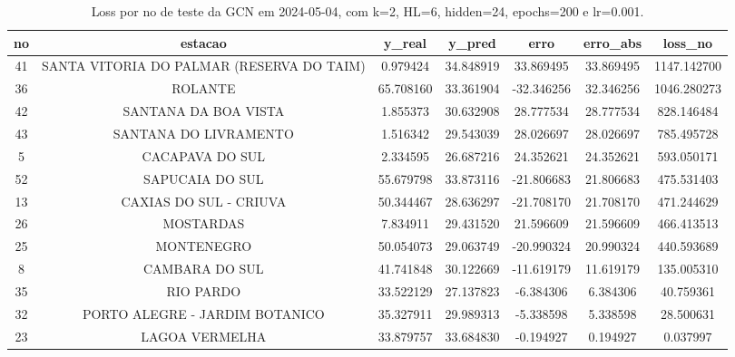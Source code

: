 \begin{table}[h]
\centering
\caption{Loss por no de teste da GCN em 2024-05-04, com k=2, HL=6, hidden=24, epochs=200 e lr=0.001.}
\label{tab:gcn_loss_k2_hl6_h24_e200_d20240504}
\begin{tabular}{ccccccc}
\toprule
no & estacao & y\_real & y\_pred & erro & erro\_abs & loss\_no \\
\midrule
41 & SANTA VITORIA DO PALMAR (RESERVA DO TAIM) & 0.979424 & 34.848919 & 33.869495 & 33.869495 & 1147.142700 \\
36 & ROLANTE & 65.708160 & 33.361904 & -32.346256 & 32.346256 & 1046.280273 \\
42 & SANTANA DA BOA VISTA & 1.855373 & 30.632908 & 28.777534 & 28.777534 & 828.146484 \\
43 & SANTANA DO LIVRAMENTO & 1.516342 & 29.543039 & 28.026697 & 28.026697 & 785.495728 \\
5 & CACAPAVA DO SUL & 2.334595 & 26.687216 & 24.352621 & 24.352621 & 593.050171 \\
52 & SAPUCAIA DO SUL & 55.679798 & 33.873116 & -21.806683 & 21.806683 & 475.531403 \\
13 & CAXIAS DO SUL - CRIUVA & 50.344467 & 28.636297 & -21.708170 & 21.708170 & 471.244629 \\
26 & MOSTARDAS & 7.834911 & 29.431520 & 21.596609 & 21.596609 & 466.413513 \\
25 & MONTENEGRO & 50.054073 & 29.063749 & -20.990324 & 20.990324 & 440.593689 \\
8 & CAMBARA DO SUL & 41.741848 & 30.122669 & -11.619179 & 11.619179 & 135.005310 \\
35 & RIO PARDO & 33.522129 & 27.137823 & -6.384306 & 6.384306 & 40.759361 \\
32 & PORTO ALEGRE - JARDIM BOTANICO & 35.327911 & 29.989313 & -5.338598 & 5.338598 & 28.500631 \\
23 & LAGOA VERMELHA & 33.879757 & 33.684830 & -0.194927 & 0.194927 & 0.037997 \\
\bottomrule
\end{tabular}
\end{table}
